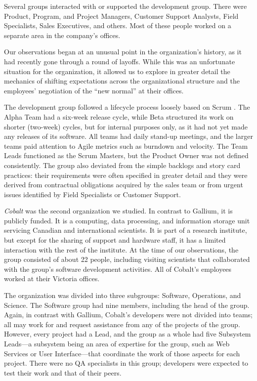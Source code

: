 \documentclass[10pt, conference, compsocconf]{IEEEtran}
\begin{document}
Several groups interacted with or supported the development group. There were Product, Program, and Project Managers, Customer Support Analysts, Field Specialists, Sales Executives, and others. Most of these people worked on a separate area in the company's offices.

Our observations began at an unusual point in the organization's history, as it had recently gone through a round of layoffs. While this was an unfortunate situation for the organization, it allowed us to explore in greater detail the mechanics of shifting expectations across the organizational structure and the employees' negotiation of the ``new normal'' at their offices.

The development group followed a lifecycle process loosely based on Scrum \cite{Schwaber2001}. The Alpha Team had a six-week release cycle, while Beta structured its work on shorter (two-week) cycles, but for internal purposes only, as it had not yet made any releases of its software. All teams had daily stand-up meetings, and the larger teams paid attention to Agile metrics such as burndown and velocity. The Team Leads functioned as the Scrum Masters, but the Product Owner was not defined consistently. The group also deviated from the simple backlogs and story card practices: their requirements were often specified in greater detail and they were derived from contractual obligations acquired by the sales team or from urgent issues identified by Field Specialists or Customer Support.

\emph{Cobalt} was the second organization we studied. In contrast to Gallium, it is publicly funded. It is a computing, data processing, and information storage unit servicing Canadian and international scientists. It is part of a research institute, but except for the sharing of support and hardware staff, it has a limited interaction with the rest of the institute. At the time of our observations, the group consisted of about 22 people, including visiting scientists that collaborated with the group's software development activities. All of Cobalt's employees worked at their Victoria offices.

The organization was divided into three subgroups: Software, Operations, and Science. The Software group had nine members, including the head of the group. Again, in contrast with Gallium, Cobalt's developers were not divided into teams; all may work for and request assistance from any of the projects of the group. However, every project had a Lead, and the group as a whole had five Subsystem Leads---a subsystem being an area of expertise for the group, such as Web Services or User Interface---that coordinate the work of those aspects for each project. There were no QA specialists in this group; developers were expected to test their work and that of their peers.
\end{document}
